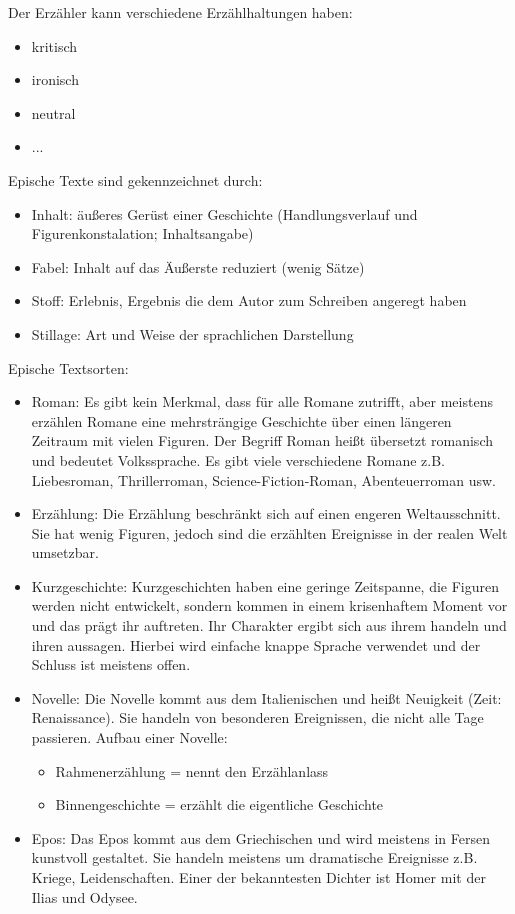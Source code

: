 \documentclass[12pt,a4paper]{article}
\begin{document}
Der Erzähler kann verschiedene Erzählhaltungen haben:

	\begin{itemize}
	\item kritisch
	\item ironisch
	\item neutral
	\item ...
	\end{itemize}

Epische Texte sind gekennzeichnet durch:

	\begin{itemize}
	\item Inhalt: äußeres Gerüst einer Geschichte (Handlungsverlauf und Figurenkonstalation; Inhaltsangabe)
	\item Fabel: Inhalt auf das Äußerste reduziert (wenig Sätze)
	\item Stoff: Erlebnis, Ergebnis die dem Autor zum Schreiben angeregt haben
	\item Stillage: Art und Weise der sprachlichen Darstellung 
	\end{itemize}	
	
Epische Textsorten:

	\begin{itemize}
	\item Roman: Es gibt kein Merkmal, dass für alle Romane zutrifft, aber meistens erzählen Romane eine mehrsträngige Geschichte über
	einen längeren Zeitraum mit vielen Figuren. Der Begriff Roman heißt übersetzt romanisch und bedeutet Volkssprache. Es gibt viele verschiedene
	Romane z.B. Liebesroman, Thrillerroman, Science-Fiction-Roman, Abenteuerroman usw.
	\item Erzählung: Die Erzählung beschränkt sich auf einen engeren Weltausschnitt. Sie hat wenig Figuren, jedoch sind die erzählten Ereignisse in
	der realen Welt umsetzbar.
	\item Kurzgeschichte: Kurzgeschichten haben eine geringe Zeitspanne, die Figuren werden nicht entwickelt, sondern kommen in einem krisenhaftem
	Moment vor und das prägt ihr auftreten. Ihr Charakter ergibt sich aus ihrem handeln und ihren aussagen. Hierbei wird einfache knappe Sprache 
	verwendet und der Schluss ist meistens offen.
	\item Novelle: Die Novelle kommt aus dem Italienischen und heißt Neuigkeit (Zeit: Renaissance). Sie handeln von besonderen Ereignissen, die nicht alle Tage passieren. Aufbau einer Novelle:
		\begin{itemize}
		\item Rahmenerzählung = nennt den Erzählanlass
		\item Binnengeschichte = erzählt die eigentliche Geschichte
		\end{itemize}
	\item Epos: Das Epos kommt aus dem Griechischen und wird meistens in Fersen kunstvoll gestaltet. Sie handeln meistens um dramatische 
	Ereignisse z.B. Kriege, Leidenschaften. Einer der bekanntesten Dichter ist Homer mit der Ilias und Odysee.
	\end{itemize}
	
\end{document}
